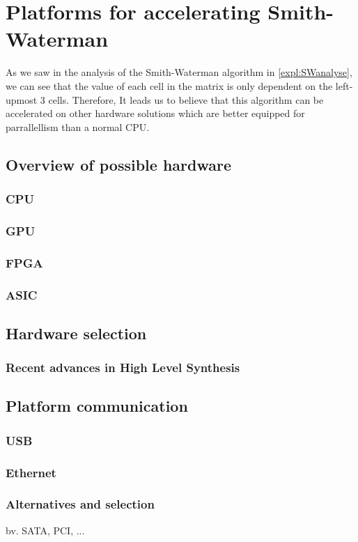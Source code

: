 
\chapter{Platforms for accelerating Smith-Waterman}
\label{ch:Platforms}

As we saw in the analysis of the Smith-Waterman algorithm in \ref{expl:SWanalyse}, we can see that the value of each cell in the matrix is only dependent on the left-upmost 3 cells. Therefore, It leads us to believe that this algorithm can be accelerated on other hardware solutions which are better equipped for parrallellism than a normal CPU.

\section{Overview of possible hardware}

\subsection{CPU}
\subsection{GPU}
\subsection{FPGA}
\subsection{ASIC}

\section{Hardware selection}

\subsection{Recent advances in High Level Synthesis}

\section{Platform communication}

\subsection{USB}
\subsection{Ethernet}
\subsection{Alternatives and selection}

bv. SATA, PCI, ...


